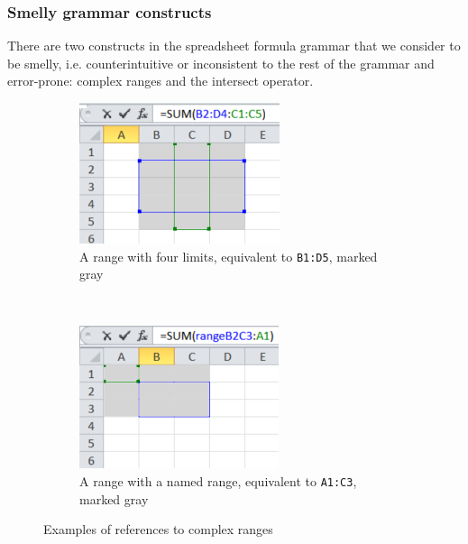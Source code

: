 \documentclass[conference]{IEEEtran}
\begin{document}
\subsubsection{Smelly grammar constructs}
There are two constructs in the spreadsheet formula grammar that we consider to be smelly, i.e. counterintuitive or inconsistent to the rest of the grammar and error-prone: complex ranges and the intersect operator.
\begin{figure}
	\centering
	\begin{subfigure}[b]{0.3\textwidth}
		\centering
		\includegraphics{complexRanges}
		\caption{A range with four limits, equivalent to \texttt{B1:D5}, marked gray}
		\label{fig:complexA}
	\end{subfigure}
	~ %
	\begin{subfigure}[b]{0.3\textwidth}
		\centering
		\includegraphics{complexNamedRanges}
		\caption{A range with a named range, equivalent to \texttt{A1:C3}, marked gray}
		\label{fig:complexB}
	\end{subfigure}
	\caption{Examples of references to complex ranges}\label{Figure:ComplexRanges}
\end{figure}
\end{document}
